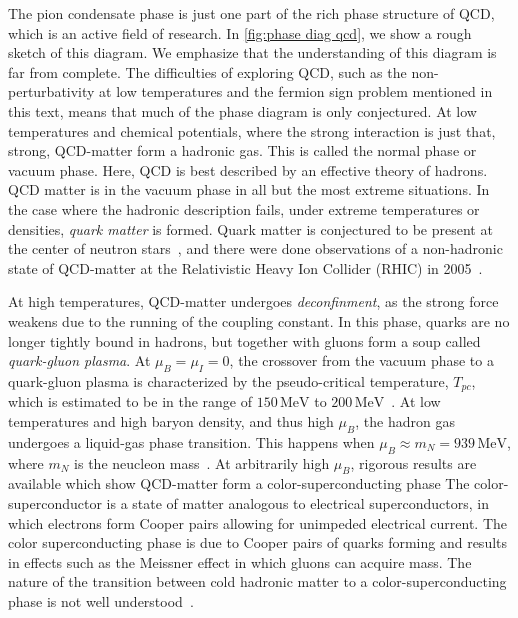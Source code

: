 The pion condensate phase is just one part of the rich phase structure of QCD, which is an active field of research.
In \autoref{fig:phase diag qcd}, we show a rough sketch of this diagram.
We emphasize that the understanding of this diagram is far from complete.
The difficulties of exploring QCD, such as the non-perturbativity at low temperatures and the fermion sign problem mentioned in this text, means that much of the phase diagram is only conjectured.
At low temperatures and chemical potentials, where the strong interaction is just that, strong, QCD-matter form a hadronic gas.
This is called the normal phase or vacuum phase.
Here, QCD is best described by an effective theory of hadrons.
QCD matter is in the vacuum phase in all but the most extreme situations.
In the case where the hadronic description fails, under extreme temperatures or densities, \emph{quark matter} is formed.
Quark matter is conjectured to be present at the center of neutron stars~\cite{from_hadrons_to_quarks}, and there were done observations of a non-hadronic state of QCD-matter at the Relativistic Heavy Ion Collider (RHIC) in 2005~\cite{2005:RHIC,2005:RHIC2}.

At high temperatures, QCD-matter undergoes \emph{deconfinment}, as the strong force weakens due to the running of the coupling constant.
In this phase, quarks are no longer tightly bound in hadrons, but together with gluons form a soup called \emph{quark-gluon plasma}.
At $\mu_B = \mu_I = 0$, the crossover from the vacuum phase to a quark-gluon plasma is characterized by the pseudo-critical temperature, $T_{pc}$, which is estimated to be in the range of $150 \, \text{MeV}$ to $200 \, \text{MeV}$~\cite{Fukushima:The_phase_diagram_of_dense_QCD}.
At low temperatures and high baryon density, and thus high $\mu_B$, the hadron gas undergoes a liquid-gas phase transition.
This happens when $\mu_B \approx m_N = 939 \, \text{MeV}$, where $m_N$ is the neucleon mass~\cite{Fukushima:The_phase_diagram_of_dense_QCD}.
At arbitrarily high $\mu_B$, rigorous results are available which show QCD-matter form a color-superconducting phase
The color-superconductor is a state of matter analogous to electrical superconductors, in which electrons form Cooper pairs allowing for unimpeded electrical current.
The color superconducting phase is due to Cooper pairs of quarks forming and results in effects such as the Meissner effect in which gluons can acquire mass.
The nature of the transition between cold hadronic matter to a color-superconducting phase is not well understood~\cite{alford:color_superconductivity}.

